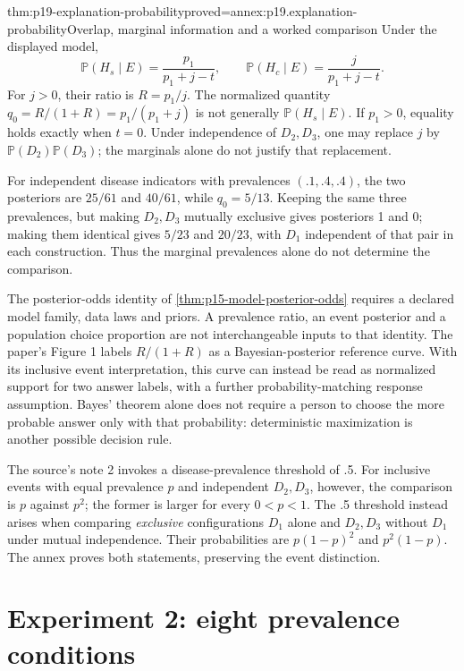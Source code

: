 \begin{hbtheorem}{thm:p19-explanation-probability}{proved=annex:p19.explanation-probability}{Overlap, marginal information and a worked comparison}
Under the displayed model,
\[
 \mathbb P(H_s\mid E)=\frac{p_1}{p_1+j-t},\qquad
 \mathbb P(H_c\mid E)=\frac{j}{p_1+j-t}.
\]
For \(j>0\), their ratio is \(R=p_1/j\).
The normalized quantity \(q_0=R/(1+R)=p_1/(p_1+j)\)
is not generally \(\mathbb P(H_s\mid E)\).
If \(p_1>0\), equality holds exactly when \(t=0\).
Under independence of \(D_2,D_3\), one may replace \(j\) by
\(\mathbb P(D_2)\mathbb P(D_3)\); the marginals alone do not
justify that replacement.

For independent disease indicators with prevalences
\((.1,.4,.4)\), the two posteriors are \(25/61\) and \(40/61\),
while \(q_0=5/13\).
Keeping the same three prevalences, but making \(D_2,D_3\)
mutually exclusive gives posteriors 1 and 0; making them
identical gives \(5/23\) and \(20/23\), with \(D_1\) independent
of that pair in each construction.
Thus the marginal prevalences alone do not determine the comparison.
\end{hbtheorem}

The posterior-odds identity of \cref{thm:p15-model-posterior-odds}
requires a declared model family, data laws and priors. A prevalence
ratio, an event posterior and a population choice proportion are
not interchangeable inputs to that identity.
The paper's Figure 1 labels \(R/(1+R)\) as a Bayesian-posterior
reference curve. With its inclusive event interpretation, this
curve can instead be read as normalized support for two answer
labels, with a further probability-matching response assumption.
Bayes' theorem alone does not require a person to choose the
more probable answer only with that probability: deterministic
maximization is another possible decision rule.

The source's note 2 invokes a disease-prevalence threshold of .5.
For inclusive events with equal prevalence \(p\) and independent
\(D_2,D_3\), however, the comparison is \(p\) against \(p^2\);
the former is larger for every \(0<p<1\).
The .5 threshold instead arises when comparing \emph{exclusive}
configurations \(D_1\) alone and \(D_2,D_3\) without \(D_1\)
under mutual independence. Their probabilities are
\(p(1-p)^2\) and \(p^2(1-p)\).
The annex proves both statements, preserving the event distinction.

\section{Experiment 2: eight prevalence conditions}
\label{sec:p19-explanation-experiment-two}

